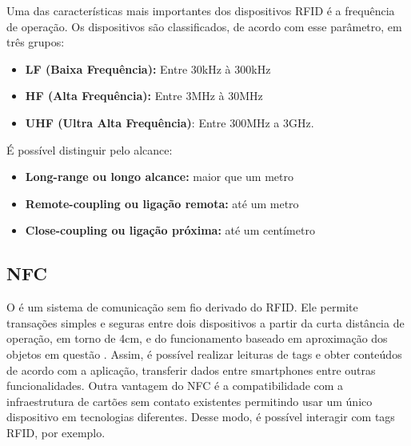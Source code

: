 

Uma das características mais importantes dos dispositivos RFID é a frequência de operação.
Os dispositivos são classificados, de acordo com esse parâmetro, em três grupos:

\begin{itemize} \parskip -4pt
	\item \textbf{LF (Baixa Frequência):} Entre 30kHz à 300kHz
	\item \textbf{HF (Alta Frequência):} Entre 3MHz à 30MHz
	\item \textbf{UHF (Ultra Alta Frequência)}: Entre 300MHz a 3GHz.
\end{itemize}

É possível distinguir pelo alcance:

\begin{itemize} \parskip -4pt
	\item \textbf{{Long-range} ou longo alcance:} maior que um metro
	\item \textbf{{Remote-coupling} ou ligação remota:} até um metro
	\item \textbf{{Close-coupling} ou ligação próxima:} até um centímetro
\end{itemize}


\subsection{NFC}
O  é um sistema de comunicação sem fio derivado do RFID. Ele permite transações simples e seguras entre dois dispositivos a partir da curta distância de operação, em torno de 4cm, e do funcionamento baseado em aproximação dos objetos em questão \cite{NFCForum2016}. 
Assim, é possível realizar leituras de tags e obter conteúdos de acordo com a aplicação, transferir dados entre smartphones entre outras funcionalidades.
Outra vantagem do NFC é a compatibilidade com a infraestrutura de cartões sem contato existentes permitindo usar um único dispositivo em tecnologias diferentes. Desse modo, é possível interagir com tags RFID, por exemplo.


